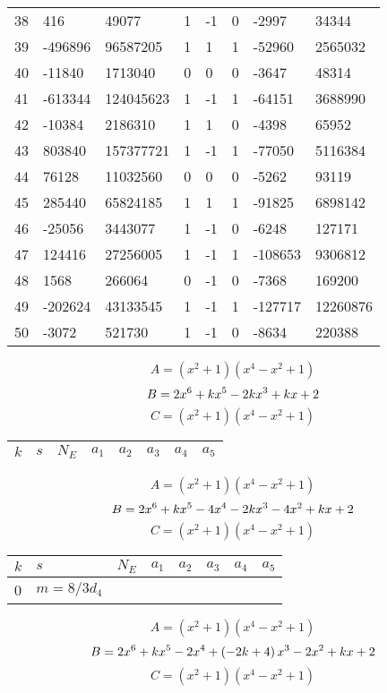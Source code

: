 \documentclass{amsart}
\begin{document}
\begin{longtable}{|l|l|l|lllll|}
38&416&49077&1&-1&0&-2997&34344\\
39&-496896&96587205&1&1&1&-52960&2565032\\
40&-11840&1713040&0&0&0&-3647&48314\\
41&-613344&124045623&1&-1&1&-64151&3688990\\
42&-10384&2186310&1&1&0&-4398&65952\\
43&803840&157377721&1&-1&1&-77050&5116384\\
44&76128&11032560&0&0&0&-5262&93119\\
45&285440&65824185&1&1&1&-91825&6898142\\
46&-25056&3443077&1&-1&0&-6248&127171\\
47&124416&27256005&1&-1&1&-108653&9306812\\
48&1568&266064&0&-1&0&-7368&169200\\
49&-202624&43133545&1&-1&1&-127717&12260876\\
50&-3072&521730&1&-1&0&-8634&220388\\
\hline
\end{longtable}
$$A=(x^2
 + 1)(x^4
 - x^2
 + 1)$$
$$B=2\*x^6
 + k\*x^5
 - 2\*k\*x^3
 + k\*x
 + 2$$
$$C=(x^2
 + 1)(x^4
 - x^2
 + 1)$$
\begin{longtable}{|l|l|l|lllll|}
\hline
$k$ & $s$ & $N_E$ & $a_1$ & $a_2$ & $a_3$ & $a_4$ & $a_5$\\
\hline
\hline
\end{longtable}
$$A=(x^2
 + 1)(x^4
 - x^2
 + 1)$$
$$B=2\*x^6
 + k\*x^5
 - 4\*x^4
 - 2\*k\*x^3
 - 4\*x^2
 + k\*x
 + 2$$
$$C=(x^2
 + 1)(x^4
 - x^2
 + 1)$$
\begin{longtable}{|l|l|l|lllll|}
\hline
$k$ & $s$ & $N_E$ & $a_1$ & $a_2$ & $a_3$ & $a_4$ & $a_5$\\
\hline
0&$m=8/3d_{4}$&&\multicolumn{5}{c|}{}\\
\hline
\end{longtable}
$$A=(x^2
 + 1)(x^4
 - x^2
 + 1)$$
$$B=2\*x^6
 + k\*x^5
 - 2\*x^4
 + \left(-2\*k
 + 4\right) \*x^3
 - 2\*x^2
 + k\*x
 + 2$$
$$C=(x^2
 + 1)(x^4
 - x^2
 + 1)$$
\end{document}
